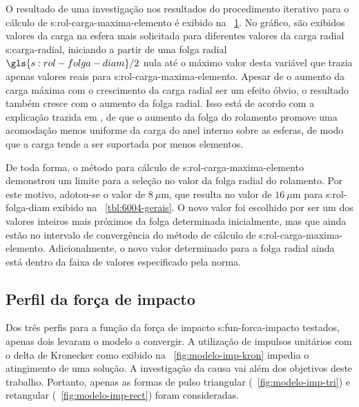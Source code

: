\documentclass[12pt,oneside,english,brazil,lmodern,siglas,simbolos,cite=num]{ucsmonograph}
\begin{document}
	O resultado de uma investigação nos resultados do procedimento iterativo para o cálculo de \gls{s:rol-carga-maxima-elemento} é exibido na \figurename\ \ref{fig:modelo-converg-carga-max}.
	No gráfico, são exibidos valores da carga na esfera mais solicitada para diferentes valores da carga radial \gls{s:carga-radial}, iniciando a partir de uma folga radial $\gls{s:rol-folga-diam}/2$ nula até o máximo valor desta variável que trazia apenas valores reais para \gls{s:rol-carga-maxima-elemento}.
	Apesar de o aumento da carga máxima com o crescimento da carga radial ser um efeito óbvio, o resultado também cresce com o aumento da folga radial.
	Isso está de acordo com a explicação trazida em \cite{hamrock:1991}, de que o aumento da folga do rolamento promove uma acomodação menos uniforme da carga do anel interno sobre as esferas, de modo que a carga tende a ser suportada por menos elementos.
	
	\begin{figure}[t]
		\label{fig:modelo-converg-carga-max}
	\end{figure}

	De toda forma, o método para cálculo de \gls{s:rol-carga-maxima-elemento} demonstrou um limite para a seleção no valor da folga radial do rolamento. Por este motivo, adotou-se o valor de $8\ \mu\text{m}$, que resulta no valor de $16\ \mu\text{m}$ para \gls{s:rol-folga-diam} exibido na \tablename\ \ref{tbl:6004-gerais}.
	O novo valor foi escolhido por ser um dos valores inteiros mais próximos da folga determinada inicialmente, mas que ainda estão no intervalo de convergência do método de cálculo de \gls{s:rol-carga-maxima-elemento}.
	Adicionalmente, o novo valor determinado para a folga radial ainda está dentro da faixa de valores especificado pela norma.
	
	\subsection{Perfil da força de impacto}
	Dos três perfis para a função da força de impacto \gls{s:fun-forca-impacto} testados, apenas dois levaram o modelo a convergir.
	A utilização de impulsos unitários com o delta de Kronecker como exibido na \figurename\ \ref{fig:modelo-imp-kron} impedia o atingimento de uma solução.
	A investigação da causa vai além dos objetivos deste trabalho.
	Portanto, apenas as formas de pulso triangular (\figurename\ \ref{fig:modelo-imp-tri}) e retangular (\figurename\ \ref{fig:modelo-imp-rect}) foram consideradas.
	
\end{document}
